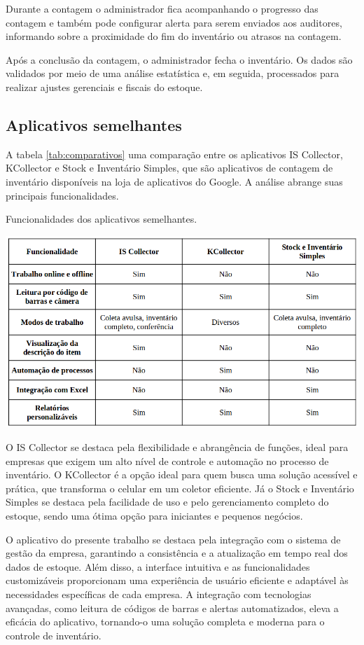 Durante a contagem o administrador fica acompanhando o progresso das contagem e também pode configurar alerta para serem enviados aos auditores, informando sobre a proximidade do fim do inventário ou atrasos na contagem.

Após a conclusão da contagem, o administrador fecha o inventário. Os dados são validados por meio de uma análise estatística e, em seguida, processados para realizar ajustes gerenciais e fiscais do estoque.

\subsection{Aplicativos semelhantes}

A tabela \ref{tab:comparativos} uma comparação entre os aplicativos IS Collector, KCollector e Stock e Inventário Simples, que são aplicativos de contagem de inventário disponíveis na loja de aplicativos do Google. A análise abrange suas principais funcionalidades.

\begin{table}[t]
    \centering
    \caption{Funcionalidades dos aplicativos semelhantes.}
    \label{tab:comparativos}
    \includegraphics[width=1.0\textwidth]{tables/comparativo.png}
\end{table}

O IS Collector se destaca pela flexibilidade e abrangência de funções, ideal para empresas que exigem um alto nível de controle e automação no processo de inventário. O KCollector é a opção ideal para quem busca uma solução acessível e prática, que transforma o celular em um coletor eficiente. Já o Stock e Inventário Simples se destaca pela facilidade de uso e pelo gerenciamento completo do estoque, sendo uma ótima opção para iniciantes e pequenos negócios.

O aplicativo do presente trabalho se destaca pela integração com o sistema de gestão da empresa, garantindo a consistência e a atualização em tempo real dos dados de estoque. Além disso, a interface intuitiva e as funcionalidades customizáveis proporcionam uma experiência de usuário eficiente e adaptável às necessidades específicas de cada empresa. A integração com tecnologias avançadas, como leitura de códigos de barras e alertas automatizados, eleva a eficácia do aplicativo, tornando-o uma solução completa e moderna para o controle de inventário.

